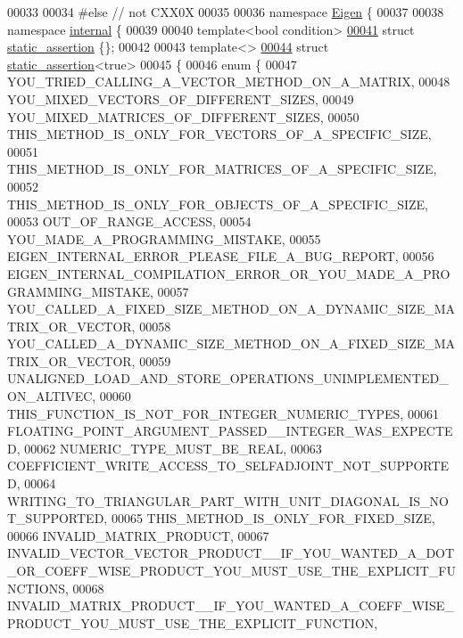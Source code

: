 \begin{DoxyCode}
00033 
00034 \textcolor{preprocessor}{  #else // not CXX0X}
00035 
00036     \textcolor{keyword}{namespace }\hyperlink{namespace_eigen}{Eigen} \{
00037 
00038     \textcolor{keyword}{namespace }\hyperlink{namespaceinternal}{internal} \{
00039 
00040     \textcolor{keyword}{template}<\textcolor{keywordtype}{bool} condition>
\hyperlink{struct_eigen_1_1internal_1_1static__assertion}{00041}     \textcolor{keyword}{struct }\hyperlink{struct_eigen_1_1internal_1_1static__assertion}{static\_assertion} \{\};
00042 
00043     \textcolor{keyword}{template}<>
\hyperlink{struct_eigen_1_1internal_1_1static__assertion_3_01true_01_4}{00044}     \textcolor{keyword}{struct }\hyperlink{struct_eigen_1_1internal_1_1static__assertion}{static\_assertion}<true>
00045     \{
00046       \textcolor{keyword}{enum} \{
00047         YOU\_TRIED\_CALLING\_A\_VECTOR\_METHOD\_ON\_A\_MATRIX,
00048         YOU\_MIXED\_VECTORS\_OF\_DIFFERENT\_SIZES,
00049         YOU\_MIXED\_MATRICES\_OF\_DIFFERENT\_SIZES,
00050         THIS\_METHOD\_IS\_ONLY\_FOR\_VECTORS\_OF\_A\_SPECIFIC\_SIZE,
00051         THIS\_METHOD\_IS\_ONLY\_FOR\_MATRICES\_OF\_A\_SPECIFIC\_SIZE,
00052         THIS\_METHOD\_IS\_ONLY\_FOR\_OBJECTS\_OF\_A\_SPECIFIC\_SIZE,
00053         OUT\_OF\_RANGE\_ACCESS,
00054         YOU\_MADE\_A\_PROGRAMMING\_MISTAKE,
00055         EIGEN\_INTERNAL\_ERROR\_PLEASE\_FILE\_A\_BUG\_REPORT,
00056         EIGEN\_INTERNAL\_COMPILATION\_ERROR\_OR\_YOU\_MADE\_A\_PROGRAMMING\_MISTAKE,
00057         YOU\_CALLED\_A\_FIXED\_SIZE\_METHOD\_ON\_A\_DYNAMIC\_SIZE\_MATRIX\_OR\_VECTOR,
00058         YOU\_CALLED\_A\_DYNAMIC\_SIZE\_METHOD\_ON\_A\_FIXED\_SIZE\_MATRIX\_OR\_VECTOR,
00059         UNALIGNED\_LOAD\_AND\_STORE\_OPERATIONS\_UNIMPLEMENTED\_ON\_ALTIVEC,
00060         THIS\_FUNCTION\_IS\_NOT\_FOR\_INTEGER\_NUMERIC\_TYPES,
00061         FLOATING\_POINT\_ARGUMENT\_PASSED\_\_INTEGER\_WAS\_EXPECTED,
00062         NUMERIC\_TYPE\_MUST\_BE\_REAL,
00063         COEFFICIENT\_WRITE\_ACCESS\_TO\_SELFADJOINT\_NOT\_SUPPORTED,
00064         WRITING\_TO\_TRIANGULAR\_PART\_WITH\_UNIT\_DIAGONAL\_IS\_NOT\_SUPPORTED,
00065         THIS\_METHOD\_IS\_ONLY\_FOR\_FIXED\_SIZE,
00066         INVALID\_MATRIX\_PRODUCT,
00067         
      INVALID\_VECTOR\_VECTOR\_PRODUCT\_\_IF\_YOU\_WANTED\_A\_DOT\_OR\_COEFF\_WISE\_PRODUCT\_YOU\_MUST\_USE\_THE\_EXPLICIT\_FUNCTIONS,
00068         INVALID\_MATRIX\_PRODUCT\_\_IF\_YOU\_WANTED\_A\_COEFF\_WISE\_PRODUCT\_YOU\_MUST\_USE\_THE\_EXPLICIT\_FUNCTION,

\end{DoxyCode}
